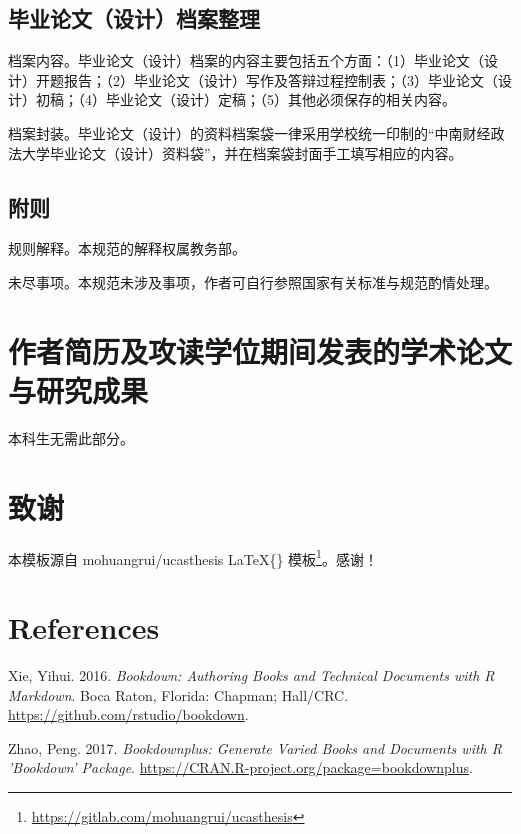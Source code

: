 \documentclass[doublesided]{Style/ucasthesis}%
\begin{document}
\hypertarget{section-34}{%
\section{毕业论文（设计）档案整理}\label{section-34}}

档案内容。毕业论文（设计）档案的内容主要包括五个方面：（1）毕业论文（设计）开题报告；（2）毕业论文（设计）写作及答辩过程控制表；（3）毕业论文（设计）初稿；（4）毕业论文（设计）定稿；（5）其他必须保存的相关内容。

档案封装。毕业论文（设计）的资料档案袋一律采用学校统一印制的``中南财经政法大学毕业论文（设计）资料袋''，并在档案袋封面手工填写相应的内容。

\hypertarget{section-35}{%
\section{附则}\label{section-35}}

规则解释。本规范的解释权属教务部。

未尽事项。本规范未涉及事项，作者可自行参照国家有关标准与规范酌情处理。

\flushbottom

\backmatter

\hypertarget{section-36}{%
\chapter{作者简历及攻读学位期间发表的学术论文与研究成果}\label{section-36}}

本科生无需此部分。

\hypertarget{section-37}{%
\chapter{致谢}\label{section-37}}

本模板源自 mohuangrui/ucasthesis \LaTeX\{\} 模板\footnote{\url{https://gitlab.com/mohuangrui/ucasthesis}}。感谢！

\backmatter

\hypertarget{references}{%
\chapter*{References}\label{references}}



\hypertarget{refs}{}
\leavevmode\hypertarget{ref-R-bookdown}{}%
Xie, Yihui. 2016. \emph{Bookdown: Authoring Books and Technical Documents with R Markdown}. Boca Raton, Florida: Chapman; Hall/CRC. \url{https://github.com/rstudio/bookdown}.

\leavevmode\hypertarget{ref-R-bookdownplus}{}%
Zhao, Peng. 2017. \emph{Bookdownplus: Generate Varied Books and Documents with R 'Bookdown' Package}. \url{https://CRAN.R-project.org/package=bookdownplus}.
\end{document}
